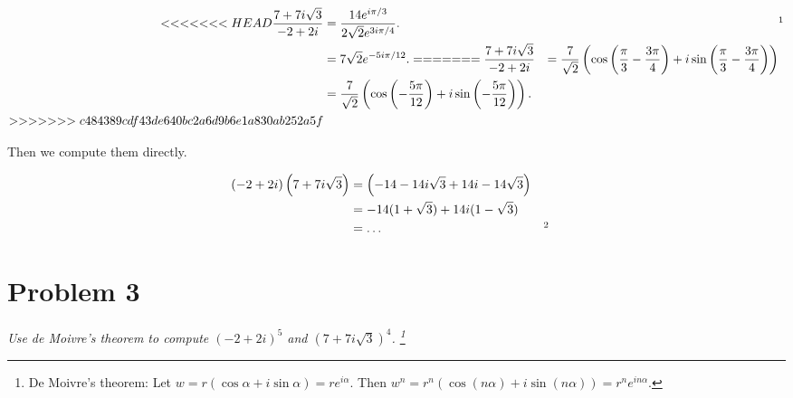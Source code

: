 \documentclass{tufte-handout}
\begin{document}
\begin{align*}
<<<<<<< HEAD
  {7 + 7i \sqrt 3 \over -2 + 2i} &= {14e^{i\pi / 3} \over 2 \sqrt 2
                                   e^{3i\pi / 4}}. && \footnotemark \\
                                 &= 7 \sqrt 2 e^{-5 i \pi / 12}.
=======
  {7 + 7i \sqrt 3 \over -2 + 2i} &= {7 \over \sqrt 2} \left( \cos{
                                   \left( {\pi \over
                                   3} - {3 \pi \over 4} \right)} + i
                                   \sin{ \left( {\pi \over 3} - {3 \pi
                                   \over 4} \right) }\right)\\
                                 &= {7 \over \sqrt 2} \left(
                                   \cos{ \left( -{5 \pi \over 12}
                                   \right)} + i
                                   \sin{ \left( -{5 \pi \over 12}
                                   \right)} \right).\\
>>>>>>> c484389cdf43de640bc2a6d9b6e1a830ab252a5f
\end{align*}

Then we compute them directly.

\begin{align*}
  (-2 + 2i)\left(7 + 7i\sqrt 3 \right) &= \left(-14 - 14 i \sqrt 3 + 14i
                                         -14 \sqrt 3\right)\\
                                       &= -14(1 + \sqrt 3) + 14i(1 -
                                         \sqrt 3)\\
                                       &= \ldots && \footnotemark
\end{align*}

\section{Problem 3}
\begin{description}
\item \textit{Use de Moivre's theorem to compute $(-2 + 2i)^5$ and $(7
    + 7i\sqrt 3)^4$. \footnote{De Moivre's theorem: Let $w = r(\cos\alpha + i\sin\alpha) = re^{i\alpha}.$ Then $w^n = r^n(\cos(n\alpha) + i\sin(n\alpha)) = r^n e^{in\alpha}$.}}
\end{description}
\end{document}
